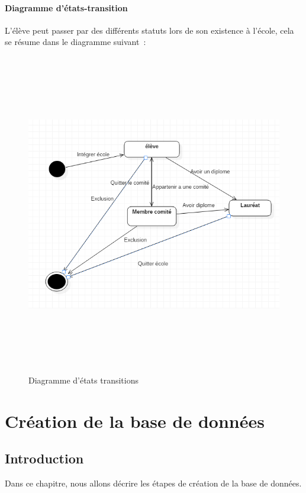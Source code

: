 \documentclass[11.5pt]{report}
\begin{document}
\subsubsection{Diagramme d’états-transition}
L’élève peut passer par des différents statuts lors de son existence à l’école, cela se résume dans le diagramme suivant :\\
\begin{figure}[h]
	
	\begin{center}
		\includegraphics[width=400pt,height=400pt]{etat_trans.png} 
		\caption{Diagramme d'états transitions}
	\end{center}
	
\end{figure}
\newpage
\chapter{Création de la base de données}
\newpage
\section{Introduction}
Dans ce chapitre, nous allons décrire les étapes de création de la base de données.\\
\end{document}
